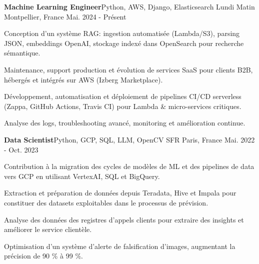

\begin{cventries}

  \cventry
    {\textbf{Machine Learning Engineer}{\enskip\cdotp\enskip}Python, AWS, Django, Elasticsearch} %
    {Lundi Matin} %
    {Montpellier, France} %
    {Mai. 2024 - Présent} %
    {
      \begin{cvitems} %
        \item {Conception d’un système RAG: ingestion automatisée (Lambda/S3), parsing JSON, embeddings OpenAI, stockage indexé dans OpenSearch pour recherche sémantique.}
        \item {Maintenance, support production et évolution de services SaaS pour clients B2B, hébergés et intégrés sur AWS (Izberg Marketplace).}
        \item {Développement, automatisation et déploiement de pipelines CI/CD serverless (Zappa, GitHub Actions, Travis CI) pour Lambda \& micro-services critiques.}
        \item {Analyse des logs, troubleshooting avancé, monitoring et amélioration continue.}
      \end{cvitems}
    }


  \cventry
    {\textbf{Data Scientist}{\enskip\cdotp\enskip}Python, GCP, SQL, LLM, OpenCV} %
    {SFR} %
    {Paris, France} %
    {Mai. 2022 - Oct. 2023} %
    {
      \begin{cvitems} %
        \item {Contribution à la migration des cycles de modèles de ML et des pipelines de data vers GCP en utilisant VertexAI, SQL et BigQuery.}
        \item {Extraction et préparation de données depuis Teradata, Hive et Impala pour constituer des datasets exploitables dans le processus de prévision.}
        \item {Analyse des données des registres d’appels clients pour extraire des insights et améliorer le service clientèle.}
        \item {Optimisation d’un système d’alerte de falsification d’images, augmentant la précision de 90 \% à 99 \%.}
      \end{cvitems}
    }


\end{cventries}
